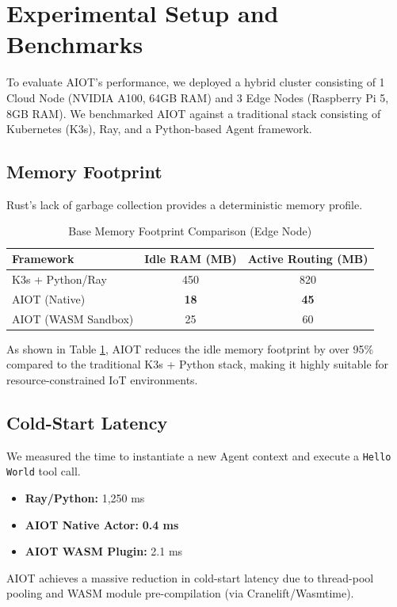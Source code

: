 \documentclass[conference,compsoc]{IEEEtran}
\begin{document}
\section{Experimental Setup and Benchmarks}
To evaluate AIOT's performance, we deployed a hybrid cluster consisting of 1 Cloud Node (NVIDIA A100, 64GB RAM) and 3 Edge Nodes (Raspberry Pi 5, 8GB RAM). We benchmarked AIOT against a traditional stack consisting of Kubernetes (K3s), Ray, and a Python-based Agent framework.

\subsection{Memory Footprint}
Rust's lack of garbage collection provides a deterministic memory profile.
\begin{table}[htbp]
\caption{Base Memory Footprint Comparison (Edge Node)}
\begin{center}
\begin{tabular}{lcc}
\toprule
\textbf{Framework} & \textbf{Idle RAM (MB)} & \textbf{Active Routing (MB)} \\
\midrule
K3s + Python/Ray & 450 & 820 \\
AIOT (Native) & \textbf{18} & \textbf{45} \\
AIOT (WASM Sandbox) & 25 & 60 \\
\bottomrule
\end{tabular}
\label{tab:memory}
\end{center}
\end{table}
As shown in Table \ref{tab:memory}, AIOT reduces the idle memory footprint by over 95\% compared to the traditional K3s + Python stack, making it highly suitable for resource-constrained IoT environments.

\subsection{Cold-Start Latency}
We measured the time to instantiate a new Agent context and execute a \texttt{Hello World} tool call.
\begin{itemize}
    \item \textbf{Ray/Python:} 1,250 ms
    \item \textbf{AIOT Native Actor:} \textbf{0.4 ms}
    \item \textbf{AIOT WASM Plugin:} 2.1 ms
\end{itemize}
AIOT achieves a massive reduction in cold-start latency due to thread-pool pooling and WASM module pre-compilation (via Cranelift/Wasmtime).
\end{document}
